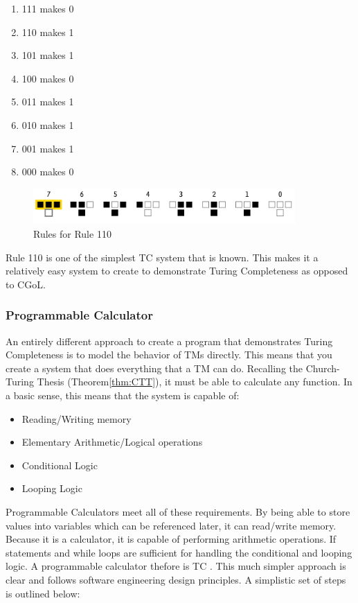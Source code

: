 \begin{enumerate}
    \item 111 makes 0
    \item 110 makes 1
    \item 101 makes 1
    \item 100 makes 0
    \item 011 makes 1
    \item 010 makes 1
    \item 001 makes 1
    \item 000 makes 0
\end{enumerate}

\begin{figure}[htb]
    \centering
    \includegraphics[width=10cm]{images/rule110.png}
       \caption{Rules for Rule 110}
           \label{fig:Rule110}
\end{figure}

Rule 110 is one of the simplest TC system that is known.
This makes it a relatively easy system to create to demonstrate Turing Completeness as opposed to CGoL.

\subsubsection{Programmable Calculator}\label{subsubsec:ProgCalc}

An entirely different approach to create a program that demonstrates Turing Completeness is to model the behavior of TMs directly.
This means that you create a system that does everything that a TM can do.
Recalling the Church-Turing Thesis (Theorem\ref{thm:CTT}), it must be able to calculate any function.
In a basic sense, this means that the system is capable of:

\begin{itemize}
    \item Reading/Writing memory
    \item Elementary Arithmetic/Logical operations
    \item Conditional Logic
    \item Looping Logic
\end{itemize}

Programmable Calculators meet all of these requirements.
By being able to store values into variables which can be referenced later, it can read/write memory.
Because it is a calculator, it is capable of performing arithmetic operations.
If statements and while loops are sufficient for handling the conditional and looping logic.
A programmable calculator thefore is TC \cite{CalcTC}.
This much simpler approach is clear and follows software engineering design principles.
A simplistic set of steps is outlined below:

